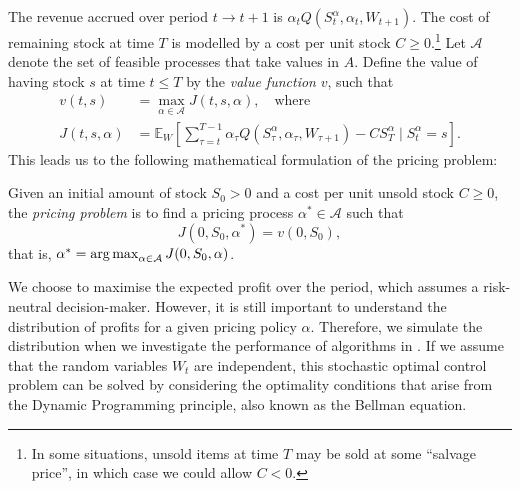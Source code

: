 \documentclass[main.tex]{subfiles}
\begin{document}
The revenue accrued over period $t\to t+1$ is $\alpha_tQ(S_t^\alpha,\alpha_t,W_{t+1})$.
The cost of remaining stock at time $T$ is modelled by a cost per unit
stock $C\geq 0$.\footnote{In some situations, unsold items at time $T$
  may be sold at some ``salvage price'', in which case we could allow
  $C<0$.}
Let $\mathcal A$ denote the set of feasible processes that take values
in $A$.
Define the value of having stock $s$ at time $t\leq T$
by the \emph{value function} $v$, such that
\begin{align}\label{eq:value_function_def}
  v(t,s)&=\max_{\alpha\in\mathcal A} J(t,s,\alpha),\quad\text{where}\\
  J(t,s,\alpha)&=
                 \mathbb E_{W}\left[ \sum_{\tau=t}^{T-1}
                 \alpha_\tau Q(S_\tau^\alpha,\alpha_\tau,W_{\tau+1})
                 - CS_T^\alpha \mid S_t^\alpha = s
                 \right].
                 \label{eq:value_function_def2}
\end{align}
This leads us to the following mathematical formulation of the pricing
problem:
\begin{mydef}
  Given an initial amount of stock $S_0>0$ and a cost per unit unsold stock $C\geq
  0$, the \emph{pricing problem} is to find a pricing process $\alpha^*\in\mathcal A$ such that
  \begin{equation}
    J(0,S_0,\alpha^*) = v(0,S_0),
  \end{equation}
  that is, $\alpha^* = \operatorname*{arg\,max}_{\alpha\in\mathcal A}J(0,S_0,\alpha)$.
\end{mydef}
We choose to maximise the expected profit over the period, which
assumes a risk-neutral decision-maker. However, it is still important
to understand the distribution of profits for a given pricing policy
$\alpha$. Therefore, we simulate the distribution when
we investigate the performance of algorithms in
. %
If we assume that the random variables $W_t$ are independent, this
stochastic optimal control problem can be solved by
considering the optimality conditions that arise from the Dynamic
Programming principle, also known as the Bellman equation.
\end{document}
